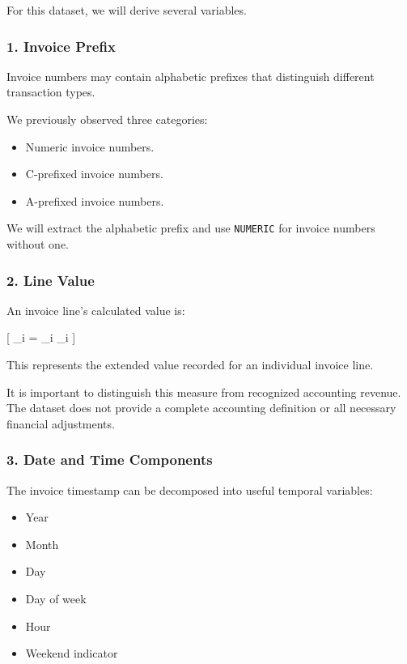 \documentclass[11pt]{article}
\providecommand{\tightlist}{%
      \setlength{\itemsep}{0pt}\setlength{\parskip}{0pt}}
\begin{document}
For this dataset, we will derive several variables.

\subsubsection{1. Invoice Prefix}\label{invoice-prefix}

Invoice numbers may contain alphabetic prefixes that distinguish
different transaction types.

We previously observed three categories:

\begin{itemize}
\tightlist
\item
  Numeric invoice numbers.
\item
  C-prefixed invoice numbers.
\item
  A-prefixed invoice numbers.
\end{itemize}

We will extract the alphabetic prefix and use \texttt{NUMERIC} for
invoice numbers without one.

\subsubsection{2. Line Value}\label{line-value}

An invoice line's calculated value is:

{[} \_i = \_i \times {}\_i
{]}

This represents the extended value recorded for an individual invoice
line.

It is important to distinguish this measure from recognized accounting
revenue. The dataset does not provide a complete accounting definition
or all necessary financial adjustments.

\subsubsection{3. Date and Time
Components}\label{date-and-time-components}

The invoice timestamp can be decomposed into useful temporal variables:

\begin{itemize}
\tightlist
\item
  Year
\item
  Month
\item
  Day
\item
  Day of week
\item
  Hour
\item
  Weekend indicator
\end{itemize}
\end{document}
